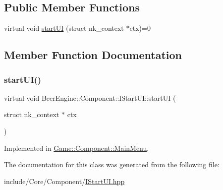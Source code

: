 \subsection*{Public Member Functions}
\begin{DoxyCompactItemize}
\item 
virtual void \mbox{\hyperlink{class_beer_engine_1_1_component_1_1_i_start_u_i_a95b739f21079f5f103da42ea34f826f2}{start\+UI}} (struct nk\+\_\+context $\ast$ctx)=0
\end{DoxyCompactItemize}


\subsection{Member Function Documentation}
\mbox{\label{class_beer_engine_1_1_component_1_1_i_start_u_i_a95b739f21079f5f103da42ea34f826f2}} 
\subsubsection{\texorpdfstring{start\+U\+I()}{startUI()}}
{\footnotesize\ttfamily virtual void Beer\+Engine\+::\+Component\+::\+I\+Start\+U\+I\+::start\+UI (\begin{DoxyParamCaption}\item[{struct nk\+\_\+context $\ast$}]{ctx }\end{DoxyParamCaption})\hspace{0.3cm}{\ttfamily [pure virtual]}}



Implemented in \mbox{\hyperlink{class_game_1_1_component_1_1_main_menu_ae50614def462ca82eb6c4404ee82a82e}{Game\+::\+Component\+::\+Main\+Menu}}.



The documentation for this class was generated from the following file\+:\begin{DoxyCompactItemize}
\item 
include/\+Core/\+Component/\mbox{\hyperlink{_i_start_u_i_8hpp}{I\+Start\+U\+I.\+hpp}}\end{DoxyCompactItemize}
